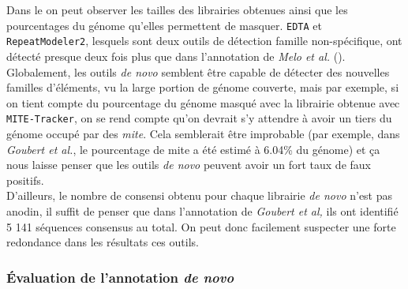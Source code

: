 \documentclass[10pt]{article}
\begin{document}
\bigskip

Dans le \tableautorefname{ \ref{tab:results_annotation}} on peut observer les tailles des librairies obtenues ainsi que les pourcentages du génome qu'elles permettent de masquer. \texttt{EDTA} et \texttt{RepeatModeler2}, lesquels sont deux outils de détection famille non-spécifique, ont détecté
presque deux fois plus que dans l'annotation de \textit{Melo et al.} \cite{melo_mosquito_2020} (\tableautorefname{ \ref{tab:annot_state_of_art}}). \\
Globalement, les outils \textit{de novo} semblent être capable de détecter des nouvelles familles d'éléments, vu la large portion de génome couverte, mais par exemple, si on tient compte du pourcentage du génome masqué avec la librairie obtenue avec \texttt{MITE-Tracker}, on se rend compte qu'on devrait s'y attendre à avoir un tiers du génome occupé par des \textit{\acrshort{mite}}. Cela semblerait être improbable (par exemple, dans \textit{Goubert et al.}, le pourcentage de \acrshort{mite} a été estimé à 6.04\% du génome) et ça nous laisse penser que les outils \textit{de novo} peuvent avoir un fort taux de faux positifs. \\
D'ailleurs, le nombre de consensi obtenu pour chaque librairie \textit{de novo} n'est pas anodin, il suffit de penser que dans l'annotation de \textit{Goubert et al,} ils ont identifié 5 141 séquences consensus au total. On peut donc facilement suspecter une forte redondance dans les résultats ces outils. \\

\subsubsection{\'Evaluation de l'annotation \textit{de novo}}
\end{document}
